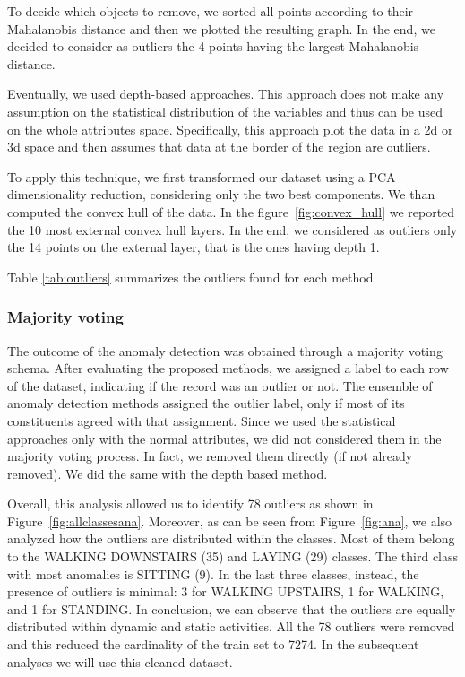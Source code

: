 \documentclass[10pt, a4paper, twocolumn]{article}
\begin{document}
To decide which objects to remove, we sorted all points according to their Mahalanobis distance and then we plotted the resulting graph. In the end, we decided to consider as outliers the 4 points having the largest Mahalanobis distance.

Eventually, we used depth-based approaches. This approach does not make any assumption on the statistical distribution of the variables and thus can be used on the whole attributes space. Specifically, this approach plot the data in a 2d or 3d space and then assumes that data at the border of the region are outliers.

To apply this technique, we first transformed our dataset using a PCA dimensionality reduction, considering only the two best components. We than computed the convex hull of the data. In the figure~\ref{fig:convex_hull} we reported the 10 most external convex hull layers.  In the end, we considered as outliers only the 14 points on the external layer, that is the ones having depth 1. 

Table \ref{tab:outliers} summarizes the outliers found for each method.

\subsubsection*{Majority voting}

The outcome of the anomaly detection was obtained through a majority voting schema. After evaluating the proposed methods, we assigned a label to each row of the dataset, indicating if the record was an outlier or not. The ensemble of anomaly detection methods assigned the outlier label, only if most of its constituents agreed with that assignment. Since we used the statistical approaches only with the normal attributes, we did not considered them in the majority voting process. In fact, we removed them directly (if not already removed). We did the same with the depth based method. 

Overall, this analysis allowed us to identify 78 outliers as shown in Figure~\ref{fig:allclassesana}. Moreover, as can be seen from Figure~\ref{fig:ana}, we also analyzed how the outliers are distributed within the classes. Most of them belong to the WALKING DOWNSTAIRS (35) and LAYING (29) classes. The third class with most anomalies is SITTING (9). 
In the last three classes, instead, the presence of outliers is minimal: 3 for WALKING UPSTAIRS, 1 for WALKING, and 1 for STANDING. In conclusion, we can observe that the outliers are equally distributed within dynamic and static activities. All the 78 outliers were removed and this reduced the cardinality of the train set to 7274. In the subsequent analyses we will use this cleaned dataset.
\end{document}
